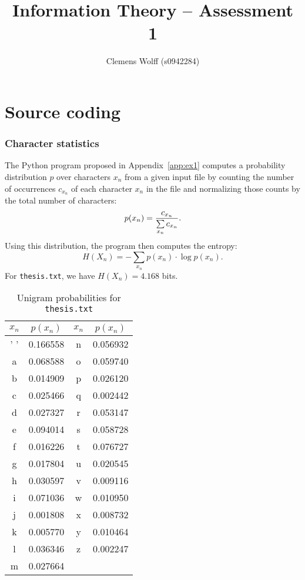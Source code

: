 \documentclass[10pt,a4paper,oneside,onecolumn]{article}
\title{Information Theory -- Assessment 1}
\author{Clemens Wolff (s0942284)}
\date{\vspace{-2em}}
\newcommand*{\thesisTXT}{{\tt thesis.txt}\xspace}
\begin{document}
\maketitle\thispagestyle{fancy}


\part{Source coding}


\section{Character statistics}\label{sec:ex1}

The Python program proposed in Appendix~\ref{app:ex1} computes a probability
distribution $p$ over characters $x_n$ from a given input file by counting the
number of occurrences $c_{x_n}$ of each character $x_n$ in the file and
normalizing those counts by the total number of characters:
\begin{equation}
    p(x_n) = {c_{x_n} \over\sum\limits_{x_n} c_{x_n}}.
\end{equation}
Using this distribution\footnotemark, the program then computes the entropy:
\begin{equation}
    H(X_n) = -\sum\limits_{x_n} p(x_n) \cdot \log p(x_n).
\end{equation}
For \thesisTXT, we have $H(X_n) = 4.168$ bits.\footnotemark
{}

\begin{table}[ht]
\centering
\begin{tabular}{| c c | c c |}
\hline
$x_n$ & $p(x_n)$ & $x_n$ & $p(x_n)$ \\
\hline
 ' '  & 0.166558 &   n   & 0.056932 \\
  a   & 0.068588 &   o   & 0.059740 \\
  b   & 0.014909 &   p   & 0.026120 \\
  c   & 0.025466 &   q   & 0.002442 \\
  d   & 0.027327 &   r   & 0.053147 \\
  e   & 0.094014 &   s   & 0.058728 \\
  f   & 0.016226 &   t   & 0.076727 \\
  g   & 0.017804 &   u   & 0.020545 \\
  h   & 0.030597 &   v   & 0.009116 \\
  i   & 0.071036 &   w   & 0.010950 \\
  j   & 0.001808 &   x   & 0.008732 \\
  k   & 0.005770 &   y   & 0.010464 \\
  l   & 0.036346 &   z   & 0.002247 \\
  m   & 0.027664 &       &          \\
\hline
\end{tabular}
\caption{Unigram probabilities for \thesisTXT}
\label{tbl:unigram-probs}
\end{table}
\end{document}
